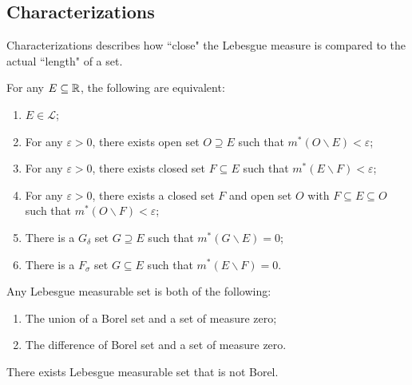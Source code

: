\documentclass[class=book, crop=false]{standalone}
\begin{document}
    \subsection{Characterizations}
    Characterizations describes how ``close" the Lebesgue measure is compared to the actual ``length" of a set.
    \begin{theorem}
        For any $E \subseteq \mathbb{R}$, the following are equivalent:
        \begin{enumerate}
            \item $E \in \mathscr{L}$;
            \item For any $\varepsilon > 0$, there exists open set $O \supseteq E$ such that $m^*(O \backslash E) < \varepsilon$;
            \item For any $\varepsilon > 0$, there exists closed set $F \subseteq E$ such that $m^*(E \backslash F) < \varepsilon$;
            \item For any $\varepsilon > 0$, there exists a closed set $F$ and open set $O$ with $F \subseteq E \subseteq O$ such that $m^*(O \backslash F) < \varepsilon$;
            \item There is a $G_{\delta}$ set $G \supseteq E$ such that $m^*(G \backslash E) = 0$;
            \item There is a $F_{\sigma}$ set $G \subseteq E$ such that $m^*(E \backslash F) = 0$.
        \end{enumerate}
    \end{theorem}

    \begin{corollary}
        Any Lebesgue measurable set is both of the following:
        \begin{enumerate}
            \item The union of a Borel set and a set of measure zero;
            \item The difference of  Borel set and a set of measure zero.
        \end{enumerate}
    \end{corollary}
    \begin{remark}
        There exists Lebesgue measurable set that is not Borel.
    \end{remark}
    
\end{document}
